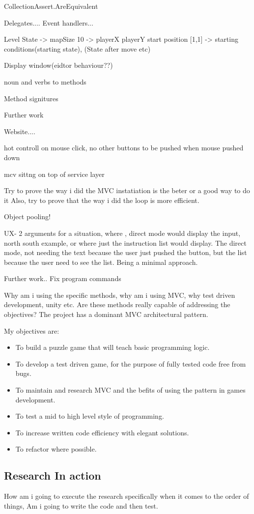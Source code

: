 CollectionAssert.AreEquivalent

Delegates....
Event handlers...

Level State -> mapSize 10 -> playerX playerY start position [1,1] -> starting conditions(starting state), (State after move etc)

Display window(eidtor behaviour??)

noun and verbs to methods

Method signitures

Further work

Website....

hot controll on mouse click, no other buttons to be pushed when mouse pushed down

mcv sittng on top of service layer

Try to prove the way i did the MVC instatiation is the beter or a good way to do it
Also, try to prove that the way i did the loop is more efficient.

Object pooling!

UX- 2 arguments for a situation, where , direct mode would display the input, north south example,
or where just the instruction list would display. The direct mode, not needing the text because the user just pushed the button, but the list because the user need to see the list. Being a minimal approach.

Further work.. Fix program commands


Why am i using the specific methods, why am i using MVC, why test driven development, unity etc.
Are these methods really capable of addressing the objectives?
The project has a dominant MVC architectural pattern.

My objectives are:
\begin{itemize}	
	\item To build a puzzle game that will teach basic programming logic.	
	\item To develop a test driven game, for the purpose of fully tested code free from bugs.	
	\item To maintain and research MVC and the befits of using the pattern in games development.	
	\item To test a mid to high level style of programming.	
	\item To increase written code efficiency with elegant solutions.	
	\item To refactor where possible.
\end{itemize}	


\subsection{Research In action}
How am i going to execute the research specifically when it comes to the order of things,
Am i going to write the code and then test.


